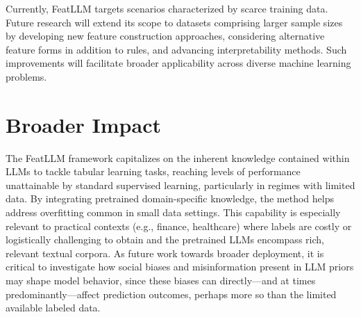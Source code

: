 Currently, \textsf{FeatLLM} targets scenarios characterized by scarce training data. Future research will extend its scope to datasets comprising larger sample sizes by developing new feature construction approaches, considering alternative feature forms in addition to rules, and advancing interpretability methods. Such improvements will facilitate broader applicability across diverse machine learning problems.

\section{Broader Impact}
The \textsf{FeatLLM} framework capitalizes on the inherent knowledge contained within LLMs to tackle tabular learning tasks, reaching levels of performance unattainable by standard supervised learning, particularly in regimes with limited data. By integrating pretrained domain-specific knowledge, the method helps address overfitting common in small data settings. This capability is especially relevant to practical contexts (e.g., finance, healthcare) where labels are costly or logistically challenging to obtain and the pretrained LLMs encompass rich, relevant textual corpora. As future work towards broader deployment, it is critical to investigate how social biases and misinformation present in LLM priors may shape model behavior, since these biases can directly—and at times predominantly—affect prediction outcomes, perhaps more so than the limited available labeled data.

